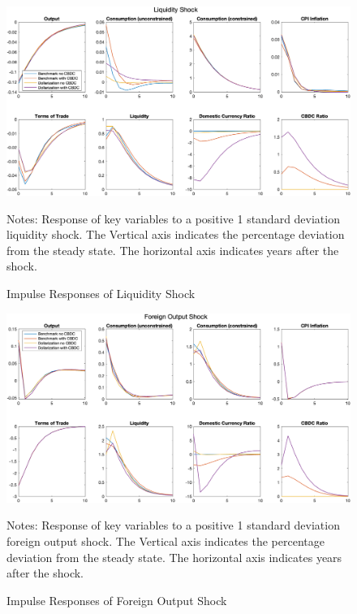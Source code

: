 \documentclass[12pt]{article}
\begin{document}
\begin{figure}[h!]
\includegraphics[width=\textwidth]{Liquidity}
\label{IRF3}
\caption{Impulse Responses of Liquidity Shock}
\scriptsize{Notes: Response of key variables to a positive 1 standard deviation liquidity shock. The Vertical axis indicates the percentage deviation from the steady state. The horizontal axis indicates years after the shock.}
\end{figure}

\begin{figure}[h!]
\includegraphics[width=\textwidth]{Y_STAR}
\label{IRF4}
\caption{Impulse Responses of Foreign Output Shock}
\scriptsize{Notes: Response of key variables to a positive 1 standard deviation foreign output shock. The Vertical axis indicates the percentage deviation from the steady state. The horizontal axis indicates years after the shock.}
\end{figure}
\end{document}

